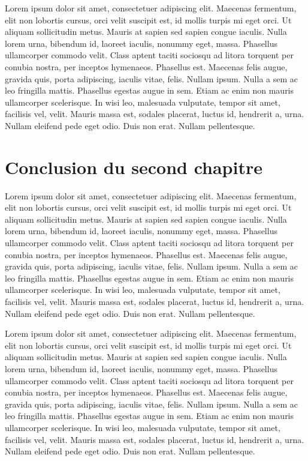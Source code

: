 Lorem ipsum dolor sit amet, consectetuer adipiscing elit. Maecenas
fermentum, elit non lobortis cursus, orci velit suscipit est, id mollis
turpis mi eget orci. Ut aliquam sollicitudin metus. Mauris at sapien sed
sapien congue iaculis. Nulla lorem urna, bibendum id, laoreet iaculis,
nonummy eget, massa. Phasellus ullamcorper commodo velit. Class aptent
taciti sociosqu ad litora torquent per conubia nostra, per inceptos
hymenaeos. Phasellus est. Maecenas felis augue, gravida quis, porta
adipiscing, iaculis vitae, felis. Nullam ipsum. Nulla a sem ac leo
fringilla mattis. Phasellus egestas augue in sem. Etiam ac enim non
mauris ullamcorper scelerisque. In wisi leo, malesuada vulputate, tempor
sit amet, facilisis vel, velit. Mauris massa est, sodales placerat,
luctus id, hendrerit a, urna. Nullam eleifend pede eget odio. Duis non
erat. Nullam pellentesque.

\hypertarget{conclusion-du-second-chapitre}{%
\section{Conclusion du second
chapitre}\label{conclusion-du-second-chapitre}}

Lorem ipsum dolor sit amet, consectetuer adipiscing elit. Maecenas
fermentum, elit non lobortis cursus, orci velit suscipit est, id mollis
turpis mi eget orci. Ut aliquam sollicitudin metus. Mauris at sapien sed
sapien congue iaculis. Nulla lorem urna, bibendum id, laoreet iaculis,
nonummy eget, massa. Phasellus ullamcorper commodo velit. Class aptent
taciti sociosqu ad litora torquent per conubia nostra, per inceptos
hymenaeos. Phasellus est. Maecenas felis augue, gravida quis, porta
adipiscing, iaculis vitae, felis. Nullam ipsum. Nulla a sem ac leo
fringilla mattis. Phasellus egestas augue in sem. Etiam ac enim non
mauris ullamcorper scelerisque. In wisi leo, malesuada vulputate, tempor
sit amet, facilisis vel, velit. Mauris massa est, sodales placerat,
luctus id, hendrerit a, urna. Nullam eleifend pede eget odio. Duis non
erat. Nullam pellentesque.

Lorem ipsum dolor sit amet, consectetuer adipiscing elit. Maecenas
fermentum, elit non lobortis cursus, orci velit suscipit est, id mollis
turpis mi eget orci. Ut aliquam sollicitudin metus. Mauris at sapien sed
sapien congue iaculis. Nulla lorem urna, bibendum id, laoreet iaculis,
nonummy eget, massa. Phasellus ullamcorper commodo velit. Class aptent
taciti sociosqu ad litora torquent per conubia nostra, per inceptos
hymenaeos. Phasellus est. Maecenas felis augue, gravida quis, porta
adipiscing, iaculis vitae, felis. Nullam ipsum. Nulla a sem ac leo
fringilla mattis. Phasellus egestas augue in sem. Etiam ac enim non
mauris ullamcorper scelerisque. In wisi leo, malesuada vulputate, tempor
sit amet, facilisis vel, velit. Mauris massa est, sodales placerat,
luctus id, hendrerit a, urna. Nullam eleifend pede eget odio. Duis non
erat. Nullam pellentesque.
